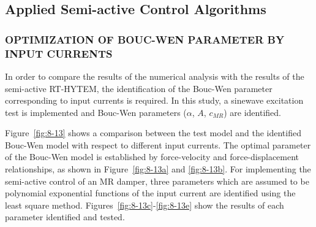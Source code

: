 \subsection{Applied Semi-active Control Algorithms}
\subsubsection{OPTIMIZATION OF BOUC-WEN PARAMETER BY INPUT CURRENTS}

In order to compare the results of the numerical analysis with the results of the semi-active RT-HYTEM, the identification of the Bouc-Wen parameter corresponding to input currents is required. In this study, a sinewave excitation test is implemented and Bouc-Wen parameters ($\alpha$, $A$, $c_{MR}$) are identified.

Figure~\ref{fig:8-13} shows a comparison between the test model and the identified Bouc-Wen model with respect to different input currents. The optimal parameter of the Bouc-Wen model is established by force-velocity and force-displacement relationships, as shown in Figure~\ref{fig:8-13a} and \ref{fig:8-13b}. For implementing the semi-active control of an MR damper, three parameters which are assumed to be polynomial exponential functions of the input current are identified using the least square method. Figures~\ref{fig:8-13c}-\ref{fig:8-13e} show the results of each parameter identified and tested.


